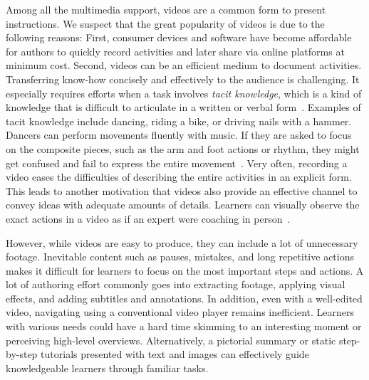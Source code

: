 Among all the multimedia support, videos are a common form to present instructions. We suspect that the great popularity of videos is due to the following reasons:
%
First, consumer devices and software have become affordable for authors to quickly record activities and later share via online platforms at minimum cost.
%
Second, videos can be an efficient medium to document activities. Transferring know-how concisely and effectively to the audience is challenging. It especially requires efforts when a task involves \emph{tacit knowledge}, which is a kind of knowledge that is difficult to articulate in a written or verbal form~\cite{polanyi1958personal, Klemmer:2006:BMF:1142405.1142429}. Examples of tacit knowledge include dancing, riding a bike, or driving nails with a hammer. Dancers can perform movements fluently with music. If they are asked to focus on the composite pieces, such as the arm and foot actions or rhythm, they might get confused and fail to express the entire movement~\cite{polanyi1958personal}. Very often, recording a video eases the difficulties of describing the entire activities in an explicit form.
%
This leads to another motivation that videos also provide an effective channel to convey ideas with adequate amounts of details. Learners can visually observe the exact actions in a video as if an expert were coaching in person~\cite{Kuznetsov:2010:REA:1868914.1868950}.

However, while videos are easy to produce, they can include a lot of unnecessary footage. Inevitable content such as pauses, mistakes, and long repetitive actions makes it difficult for learners to focus on the most important steps and actions. A lot of authoring effort commonly goes into extracting footage, applying visual effects, and adding subtitles and annotations.
%
In addition, even with a well-edited video, navigating using a conventional video player remains inefficient. Learners with various needs could have a hard time skimming to an interesting moment or perceiving high-level overviews. Alternatively, a pictorial summary or static step-by-step tutorials presented with text and images can effectively guide knowledgeable learners through familiar tasks.


